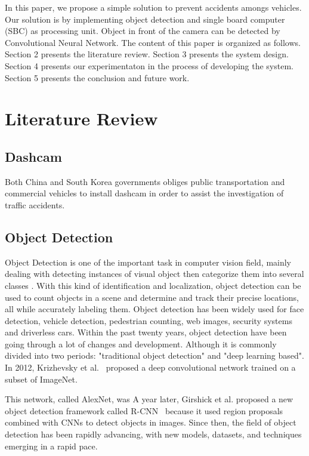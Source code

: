 \documentclass[conference]{IEEEtran}
\begin{document}
In this paper, we propose a simple solution to prevent accidents amongs vehicles. Our solution is by implementing object detection and single board computer (SBC) as processing unit. Object in front of the camera can be detected by Convolutional Neural Network. 
The content of this paper is organized as follows. Section 2 presents the literature review. Section 3 presents the system design. Section 4 presents our experimentaton in the process of developing the system. Section 5 presents the conclusion and future work.

\section{Literature Review}
\subsection{Dashcam}
Both China and South Korea governments obliges public transportation and commercial vehicles to install dashcam in order to assist the investigation of traffic accidents\cite{Korea Dashcam}.


\subsection{Object Detection}
Object Detection is one of the important task in computer vision field, mainly dealing with detecting instances of visual object then categorize them into several classes \cite{b2}.
With this kind of identification and localization, object detection can be used to count objects in a scene and determine and track their precise locations, all while accurately labeling them.
Object detection has been widely used for face detection, vehicle detection, pedestrian counting, web images, security systems and driverless cars.
Within the past twenty years, object detection have been going through a lot of changes and development. Although it is commonly divided into two periods: "traditional object detection" and "deep learning based".
In 2012, Krizhevsky et al.~\cite{b3} proposed a deep convolutional network trained on a subset of ImageNet. 

This network, called AlexNet, was 
A year later, Girshick et al. \@ proposed a new object detection framework called R-CNN~\cite{b4} because it used region proposals combined with CNNs to detect objects in images.
Since then, the field of object detection has been rapidly advancing, with new models, datasets, and techniques emerging in a rapid pace. 
\end{document}
